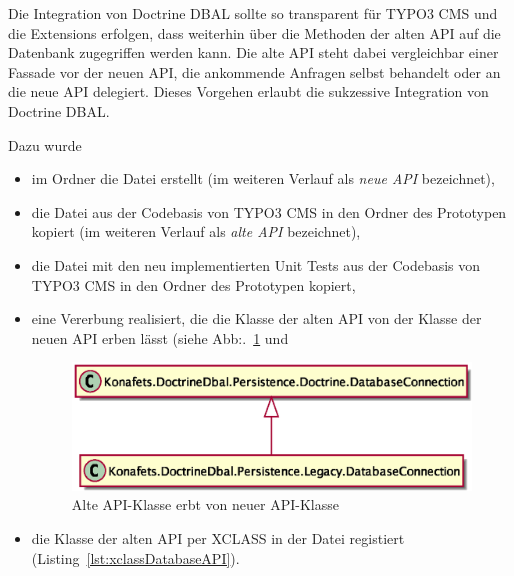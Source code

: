 Die Integration von Doctrine DBAL sollte so transparent für TYPO3 CMS und die Extensions erfolgen, dass weiterhin über die Methoden der alten API auf die Datenbank zugegriffen werden kann. Die alte API steht dabei vergleichbar einer Fassade vor der neuen API, die ankommende Anfragen selbst behandelt oder an die neue API delegiert. Dieses Vorgehen erlaubt die sukzessive Integration von Doctrine DBAL.

Dazu wurde

\begin{itemize}
	\item im Ordner  die Datei  erstellt (im weiteren Verlauf als \textit{neue API} bezeichnet),
	\item die Datei  aus der Codebasis von TYPO3 CMS in den Ordner  des Prototypen kopiert (im weiteren Verlauf als \textit{alte API} bezeichnet),
	\item die Datei  mit den neu implementierten Unit Tests aus der Codebasis von TYPO3 CMS in den Ordner  des Prototypen kopiert,
	\item eine Vererbung realisiert, die die Klasse der alten API von der Klasse der neuen API erben lässt (siehe Abb:.~\ref{fig:oldAPIextendsNewAPI} und
\begin{figure}[H]
    \centering
    \includegraphics[scale=0.5]{gfx/uml/NewAPI/OldDatabaseConnectionExtentsFromNewAPI.eps}
    \caption{Alte API-Klasse erbt von neuer API-Klasse}
    \label{fig:oldAPIextendsNewAPI}
\end{figure}
	\item die Klasse der alten API per XCLASS in der Datei  registiert (Listing~\ref{lst:xclassDatabaseAPI}).
\end{itemize}


